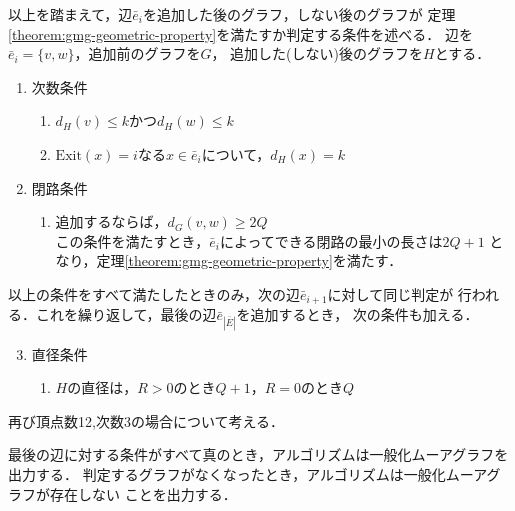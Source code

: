 以上を踏まえて，辺$\bar{e}_i$を追加した後のグラフ，しない後のグラフが
定理\ref{theorem:gmg-geometric-property}を満たすか判定する条件を述べる．
辺を$\bar{e}_i=\{v,w\}$，追加前のグラフを$G$，
追加した(しない)後のグラフを$H$とする．
\begin{enumerate}
\item 次数条件
  \label{item:degree-constraint}
  \begin{enumerate}
  \item $d_H(v)\leq k$かつ$d_H(w)\leq k$
  \item $\mathrm{Exit}(x)=i$なる$x\in\bar{e}_i$について，$d_H(x)=k$
  \end{enumerate}
\item 閉路条件
  \label{item:cycle-constraint}
  \begin{enumerate}
  \item 追加するならば，$d_G(v,w)\geq2Q$\\
    この条件を満たすとき，$\bar{e}_i$によってできる閉路の最小の長さは$2Q+1$
    となり，定理\ref{theorem:gmg-geometric-property}を満たす．
  \end{enumerate}
\end{enumerate}
以上の条件をすべて満たしたときのみ，次の辺$\bar{e}_{i+1}$に対して同じ判定が
行われる．これを繰り返して，最後の辺$\bar{e}_{|\bar{E}|}$を追加するとき，
次の条件も加える．
\begin{enumerate}\setcounter{enumi}{2}
\item 直径条件
  \label{item:diameter-constraint}
  \begin{enumerate}
  \item $H$の直径は，$R>0$のとき$Q+1$，$R=0$のとき$Q$
  \end{enumerate}
\end{enumerate}

\begin{example}
  再び頂点数12,次数3の場合について考える．
\end{example}

最後の辺に対する条件がすべて真のとき，アルゴリズムは一般化ムーアグラフを出力する．
判定するグラフがなくなったとき，アルゴリズムは一般化ムーアグラフが存在しない
ことを出力する．


